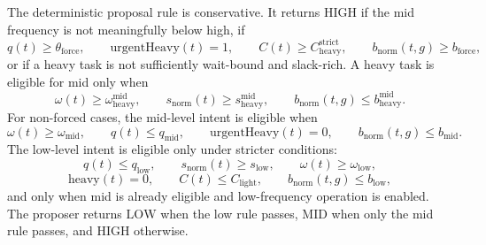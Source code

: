 The deterministic proposal rule is conservative. It returns $\mathrm{HIGH}$ if the mid frequency is not meaningfully below high, if
\begin{equation}
q(t)\geq\theta_{\mathrm{force}},
\qquad
\mathrm{urgentHeavy}(t)=1,
\qquad
C(t)\geq C_{\mathrm{heavy}}^{\mathrm{strict}},
\qquad
b_{\mathrm{norm}}(t,g)\geq b_{\mathrm{force}},
\end{equation}
or if a heavy task is not sufficiently wait-bound and slack-rich. A heavy task is eligible for mid only when
\begin{equation}
\omega(t)\geq\omega_{\mathrm{heavy}}^{\mathrm{mid}},
\qquad
s_{\mathrm{norm}}(t)\geq s_{\mathrm{heavy}}^{\mathrm{mid}},
\qquad
b_{\mathrm{norm}}(t,g)\leq b_{\mathrm{heavy}}^{\mathrm{mid}}.
\end{equation}
For non-forced cases, the mid-level intent is eligible when
\begin{equation}
\omega(t)\geq\omega_{\mathrm{mid}},
\qquad
q(t)\leq q_{\mathrm{mid}},
\qquad
\mathrm{urgentHeavy}(t)=0,
\qquad
b_{\mathrm{norm}}(t,g)\leq b_{\mathrm{mid}}.
\end{equation}
The low-level intent is eligible only under stricter conditions:
\begin{equation}
q(t)\leq q_{\mathrm{low}},
\qquad
s_{\mathrm{norm}}(t)\geq s_{\mathrm{low}},
\qquad
\omega(t)\geq\omega_{\mathrm{low}},
\end{equation}
\begin{equation}
\mathrm{heavy}(t)=0,
\qquad
C(t)\leq C_{\mathrm{light}},
\qquad
b_{\mathrm{norm}}(t,g)\leq b_{\mathrm{low}},
\end{equation}
and only when mid is already eligible and low-frequency operation is enabled. The proposer returns $\mathrm{LOW}$ when the low rule passes, $\mathrm{MID}$ when only the mid rule passes, and $\mathrm{HIGH}$ otherwise.

